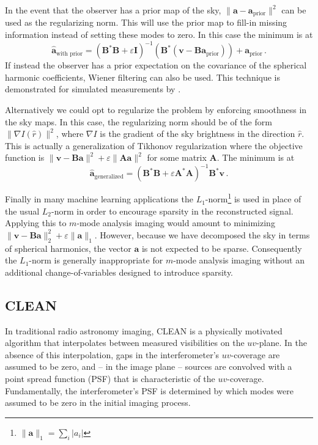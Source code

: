 \documentclass[twocolumn]{aastex61}
\renewcommand{\b}{\pmb}
\begin{document}
In the event that the observer has a prior map of the sky, $\|\b a - \b a_\text{prior}\|^2$ can be
used as the regularizing norm. This will use the prior map to fill-in missing information instead of
setting these modes to zero. In this case the minimum is at
\begin{equation}
    \b{\hat a}_\text{with prior} = (\b B^*\b B + \varepsilon\b I)^{-1}
        (\b B^*(\b v - \b B\b a_\text{prior}))
        + \b a_\text{prior}\,.
\end{equation}
If instead the observer has a prior expectation on the covariance of the spherical harmonic
coefficients, Wiener filtering can also be used.  This technique is demonstrated for simulated
measurements by \citet{2016arXiv161203255B}.

Alternatively we could opt to regularize the problem by enforcing smoothness in the sky maps. In
this case, the regularizing norm should be of the form $\|\nabla I(\hat r)\|^2$, where $\nabla I$ is
the gradient of the sky brightness in the direction $\hat r$. This is actually a generalization of
Tikhonov regularization where the objective function is $\|\b v-\b B\b a\|^2 + \varepsilon\|\b A\b
a\|^2$ for some matrix $\b A$. The minimum is at
\begin{equation}
    \b{\hat a}_\text{generalized} = (\b B^*\b B + \varepsilon\b A^*\b A)^{-1}\b B^*\b v\,.
\end{equation}

Finally in many machine learning applications the $L_1$-norm\footnote{
    $\|\b a\|_1 = \sum_i |a_i|$
} is used in place of the usual $L_2$-norm in order to encourage sparsity in the reconstructed
signal. Applying this to $m$-mode analysis imaging would amount to minimizing $\|\b v-\b B\b a\|_2^2
+ \varepsilon\|\b a\|_1$. However, because we have decomposed the sky in terms of spherical
harmonics, the vector $\b a$ is not expected to be sparse. Consequently the $L_1$-norm is generally
inappropriate for $m$-mode analysis imaging without an additional change-of-variables designed to
introduce sparsity.

\subsection{CLEAN}\label{sec:clean}

In traditional radio astronomy imaging, CLEAN \citep{1974A&AS...15..417H} is a physically motivated
algorithm that interpolates between measured visibilities on the $uv$-plane. In the absence of this
interpolation, gaps in the interferometer's $uv$-coverage are assumed to be zero, and -- in the
image plane -- sources are convolved with a point spread function (PSF) that is characteristic of
the $uv$-coverage.  Fundamentally, the interferometer's PSF is determined by which modes were
assumed to be zero in the initial imaging process.
\end{document}
